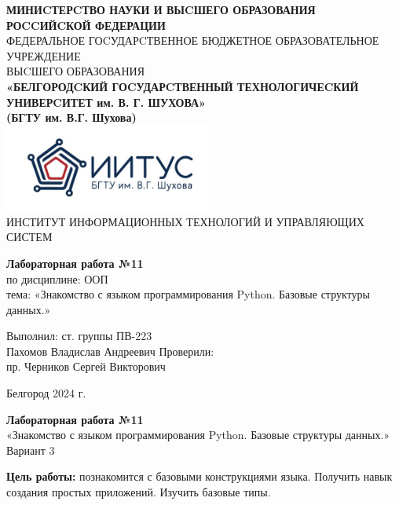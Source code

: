 \documentclass[a4paper,14pt]{extarticle}
\newcommand\textbox[1]{
	\parbox{.45\textwidth}{#1}
}
\begin{document}
\begin{center}
    \small{
        \textbf{МИНИCТЕРCТВО НАУКИ И ВЫCШЕГО ОБРАЗОВАНИЯ РОCCИЙCКОЙ ФЕДЕРАЦИИ}\\
        ФЕДЕРАЛЬНОЕ ГОCУДАРCТВЕННОЕ БЮДЖЕТНОЕ ОБРАЗОВАТЕЛЬНОЕ УЧРЕЖДЕНИЕ\\ВЫCШЕГО ОБРАЗОВАНИЯ \\
        \textbf{«БЕЛГОРОДCКИЙ ГОCУДАРCТВЕННЫЙ ТЕХНОЛОГИЧЕCКИЙ\\УНИВЕРCИТЕТ им. В. Г. ШУХОВА»\\ (БГТУ им. В.Г. Шухова)} \\
        \bigbreak
        \includegraphics[width=70mm]{log}\\
        ИНСТИТУТ ИНФОРМАЦИОННЫХ ТЕХНОЛОГИЙ И УПРАВЛЯЮЩИХ СИСТЕМ\\}
\end{center}

\vfill
\begin{center}
    \large{
        \textbf{
            Лабораторная работа №11}}\\
    \normalsize{
        по дисциплине: ООП \\
        тема: «Знакомство с языком программирования Python. Базовые структуры данных.»}
\end{center}
\vfill
\hfill\textbox{
    Выполнил: ст. группы ПВ-223\\Пахомов Владислав Андреевич
    \bigbreak
    Проверили: \\пр. Черников Сергей Викторович
}
\vfill\begin{center}
    Белгород 2024 г.
\end{center}
\newpage
\begin{center}
    \textbf{Лабораторная работа №11}\\
    «Знакомство с языком программирования Python. Базовые структуры данных.»\\
    Вариант 3
\end{center}
\textbf{Цель работы: }познакомится с базовыми конструкциями языка. Получить навык создания
простых приложений. Изучить базовые типы.\\
\end{document}
